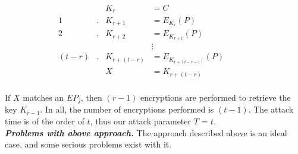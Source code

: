 \begin{align*}
& & K_r &= C & & & &\\
1&. &K_{r+1} &= E_{K_r}(P)  & & & &\\
2&. &K_{r+2} &= E_{K_{r+1}}(P) & & & &\\
& & &\vdots & & & &\\
(t-r) &. &K_{r + (t-r)} &= E_{K_{r + (t-r-1)}}(P) & & & &\\
& & X &= K_{r + (t - r)} & & & &\\
\end{align*}

If $X$ matches an $EP_j$, then $(r-1)$ encryptions are performed to retrieve the key $K_{r-1}$. In all, the number of encryptions performed is $(t-1)$. The attack time is of the order of $t$, thus our attack parameter $T$ = $t$. \\

\noindent \textit{\textbf{Problems with above approach.}} The approach described above is an ideal case, and some serious problems exist with it.

